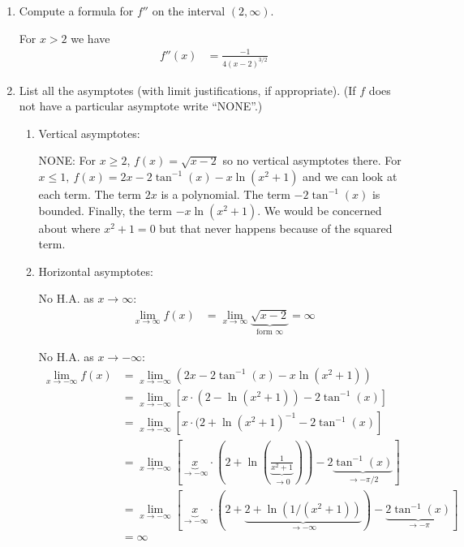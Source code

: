 \documentclass[nooutcomes,handout]{ximera}
\begin{document}
\begin{problem}
\begin{enumerate}
    \item Compute a formula for $f''$ on the interval $(2, \infty)$.
 \begin{freeResponse}
        For $x>2$ we have
        \begin{align*}
          f''(x) &= \frac{-1}{4(x-2)^{3/2}}
        \end{align*}
      \end{freeResponse}


    \item List all the asymptotes (with limit justifications, if appropriate).
      (If $f$ does not have a particular asymptote write ``NONE''.)
      \begin{enumerate}
        \item
          Vertical asymptotes:
              \begin{freeResponse}
            NONE: For $x \ge 2$, $f(x)=\sqrt{x - 2}$ so no vertical asymptotes there.  For $x \le 1,\ f(x)= 2x - 2\tan^{-1}(x) - x \ln(x^2+1)$ and we can look at each term.  The term $2x$ is a polynomial.  The term $- 2\tan^{-1}(x)$ is bounded.  Finally, the term $- x \ln(x^2+1)$.  We would be concerned about where $x^2+1=0$ but that never happens because of the squared term.
          \end{freeResponse}

        \item
          Horizontal asymptotes:
           \begin{freeResponse}
            No H.A. as $x \to \infty$:
            \begin{align*}
              \lim_{x\to\infty} f(x) &= \lim_{x \to \infty} \underbrace{\sqrt{x-2}}_{\text{form $\infty$}} = \infty
            \end{align*}

            No H.A. as $x \to -\infty$:
            \begin{align*}
              \lim_{x \to -\infty} f(x) &= \lim_{x \to -\infty} (2x - 2\tan^{-1}(x) - x \ln(x^2+1))\\
              &= \lim_{x \to -\infty} \left[x\cdot(2 - \ln(x^2+1)) - 2\tan^{-1}(x)\right]\\
              &= \lim_{x \to -\infty} \left[x \cdot(2 + \ln(x^2+1)^{-1} -2\tan^{-1}(x) \right]\\
              &= \lim_{x \to -\infty} \left[\underbrace{x}_{\text{$\to -\infty$}} \cdot \left(2 + \ln\left(\underbrace{\frac{1}{x^2+1}}_{\text{$\to 0$}}\right)\right) -2\underbrace{\tan^{-1}(x)}_{\text{$\to -\pi/2$}} \right]\\
              &= \lim_{x \to -\infty} \left[\underbrace{x}_{\text{$\to -\infty$}} \cdot \left( 2 + \underbrace{2 + \ln(1/(x^2+1))}_{\to -\infty}\right) -\underbrace{2\tan^{-1}(x)}_{\text{$\to -\pi$}} \right]\\
              &= \infty
            \end{align*}
          \end{freeResponse}
      \end{enumerate}


\end{enumerate}
\end{problem}
\end{document}
